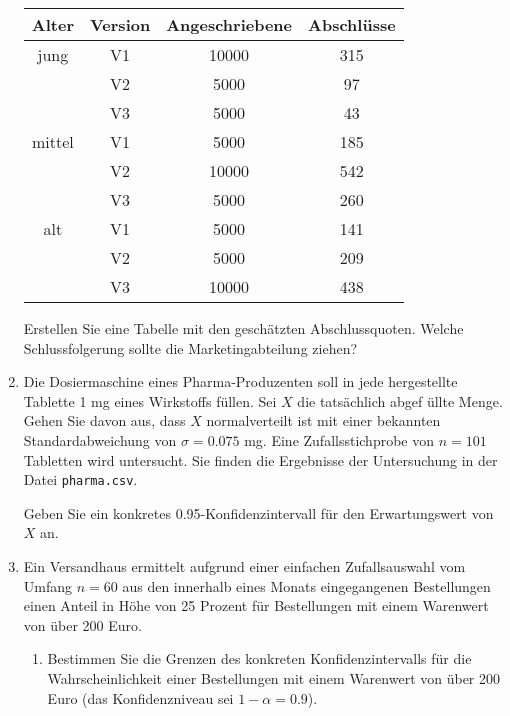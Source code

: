 \begin{enumerate}
\begin{center}%
\begin{tabular}{|c|c|c|c|}
\hline
Alter & Version & Angeschriebene & Abschl\"{u}sse \\ \hline
jung & V1 & 10000 & 315 \\ 
& V2 & 5000 & 97 \\ 
& V3 & 5000 & 43 \\ \hline
mittel & V1 & 5000 & 185 \\ 
& V2 & 10000 & 542 \\ 
& V3 & 5000 & 260 \\ \hline
alt & V1 & 5000 & 141 \\ 
& V2 & 5000 & 209 \\ 
& V3 & 10000 & 438 \\ \hline
\end{tabular}
\end{center}%

Erstellen Sie eine Tabelle mit den gesch\"{a}tzten Abschlussquoten. Welche
Schlussfolgerung sollte die Marketingabteilung ziehen?

\item Die Dosiermaschine eines Pharma-Produzenten soll in jede hergestellte
Tablette 1 mg eines Wirkstoffs f\"{u}llen. Sei $X$ die tats\"{a}chlich abgef%
\"{u}llte Menge. Gehen Sie davon aus, dass $X$ normalverteilt ist mit einer
bekannten Standardabweichung von $\sigma =0.075$ mg. Eine Zufallsstichprobe von 
$n=101$ Tabletten wird untersucht. Sie finden die Ergebnisse der
Untersuchung in der Datei \texttt{pharma.csv}.

Geben Sie ein konkretes 0.95-Konfidenzintervall f\"{u}r den Erwartungswert
von $X$ an.

\item Ein Versandhaus ermittelt aufgrund einer einfachen Zufallsauswahl vom
Umfang $n=60$ aus den innerhalb eines Monats eingegangenen Bestellungen
einen Anteil in H\"{o}he von 25 Prozent f\"{u}r Bestellungen mit einem
Warenwert von \"{u}ber 200 Euro.

\begin{enumerate}
\item Bestimmen Sie die Grenzen des konkreten Konfidenzintervalls f\"{u}r
die Wahrscheinlichkeit einer Bestellungen mit einem Warenwert von \"{u}ber
200 Euro (das Konfidenzniveau sei $1-\alpha =0.9$).


\end{enumerate}
\end{enumerate}
